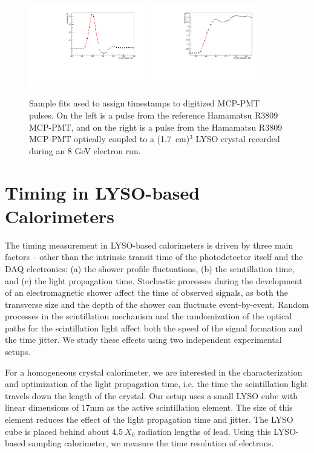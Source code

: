 \begin{figure}[h] \centering
\includegraphics[width=0.45\textwidth]{figs/timing/Reference_Pulse_GausFit_057_ev322.pdf} 
\includegraphics[width=0.45\textwidth]{figs/timing/LYSOCube_Pulse_RisingEdgeFit_057_ev313.pdf} 
\caption{ Sample fits used to assign timestamps to digitized MCP-PMT pulses. 
On the left is a pulse from the reference Hamamatsu R3809 MCP-PMT, and
on the right is a pulse from the Hamamatsu R3809 MCP-PMT
optically coupled to a (1.7~cm)$^{3}$  LYSO crystal
recorded during an 8 GeV electron run.}
\label{fig:PulseFits}
\end{figure}


\section{Timing in LYSO-based Calorimeters}
The timing measurement in 
LYSO-based calorimeters is driven by three main factors  -- other  than the intrinsic transit 
time of the photodetector itself and the DAQ electronics: (a) the shower profile fluctuations,  
(b) the scintillation time, and (c) the light propagation time. Stochastic processes during the
development of an electromagnetic shower affect the time of observed signals, as
both the transverse size and the depth of the shower can fluctuate event-by-event. 
Random processes in the scintillation mechanism and the randomization of
the optical paths for the scintillation light affect both the speed of the
signal formation and the time jitter. We study these effects using two
independent experimental setups. 

For a homogeneous crystal calorimeter, we are interested in the characterization and 
optimization of the light propagation time, i.e. the time the scintillation light travels
down the length of the crystal. Our setup uses a small LYSO cube with linear dimensions 
of $17\mathrm{mm}$ as the active scintillation element. The size of this element reduces 
the effect of the light propagation time and jitter. The LYSO cube is placed behind about 
$4.5~X_0$ radiation lengths of lead. Using this LYSO-based sampling calorimeter, we
measure the time resolution of electrons.

